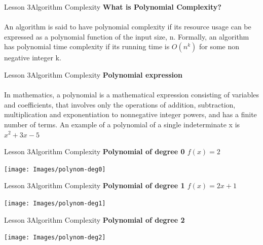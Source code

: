 \documentclass[aspectratio=1610]{beamer}
\begin{document}
\begin{frame}{Lesson 3}{Algorithm Complexity}
\LARGE
\textbf{What is Polynomial Complexity?}\\~\\
An algorithm is said to have polynomial complexity if its resource usage can be
expressed as a polynomial function of the input size, n. Formally, an algorithm
has polynomial time complexity if its running time is $O(n^k)$ for some non
negative integer k.
\end{frame}


\begin{frame}{Lesson 3}{Algorithm Complexity}
\LARGE
\textbf{Polynomial expression}\\~\\
\Large
In mathematics, a polynomial is a mathematical expression consisting of variables
and coefficients, that involves only the operations of addition, subtraction,
multiplication and exponentiation to nonnegative integer powers, and has a finite
number of terms. An example of a polynomial of a single indeterminate x is 
\(x^2 + 3x - 5\)
\end{frame}


\begin{frame}{Lesson 3}{Algorithm Complexity}
\LARGE
\textbf{Polynomial of degree 0 \(f(x)=2\)}\\
\begin{center}
\texttt{[image: Images/polynom-deg0]}
\end{center}
\end{frame}



\begin{frame}{Lesson 3}{Algorithm Complexity}
\LARGE
\textbf{Polynomial of degree 1 \(f(x) = 2x + 1\)}\\
\begin{center}
\texttt{[image: Images/polynom-deg1]}
\end{center}
\end{frame}


\begin{frame}{Lesson 3}{Algorithm Complexity}
\LARGE
\textbf{Polynomial of degree 2 }\\
\begin{center}
\texttt{[image: Images/polynom-deg2]}
\end{center}
\end{frame}
\end{document}
